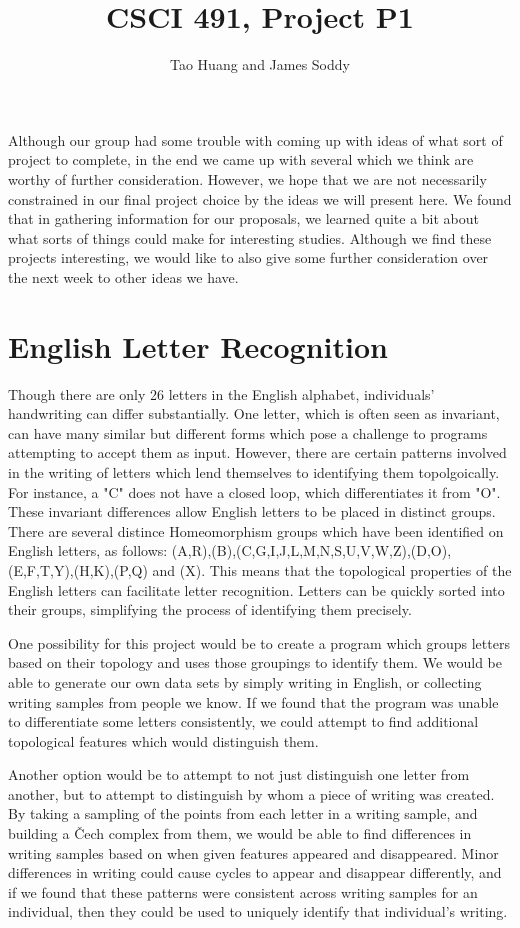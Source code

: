 \documentclass[11pt]{article}
\title{CSCI 491, Project P1}
\author{Tao Huang and James Soddy}
\begin{document}
\maketitle

Although our group had some trouble with coming up with ideas of what sort of project
to complete, in the end we came up with several which we think are worthy of
further consideration. However, we hope that we are not necessarily constrained in our 
final project choice by the ideas we will present here. We found that in gathering
information for our proposals, we learned quite a bit about what sorts of things
could make for interesting studies. Although we find these projects interesting, we
would like to also give some further consideration over the next week to other ideas we 
have.

\section*{English Letter Recognition}
Though there are only 26 letters in the English alphabet, individuals' handwriting 
can differ substantially. One letter, which is often seen as invariant, can have many
similar but different forms which pose a challenge to programs attempting to accept them 
as input. However, there are certain patterns involved in the writing of letters which
lend themselves to identifying them topolgoically. For instance, a 
"C" does not have a closed loop, which differentiates it from "O". These invariant differences
allow English letters to be placed in distinct groups. There are several distince
Homeomorphism groups which have been identified on English letters, as follows: (A,R),(B),(C,G,I,J,L,M,N,S,U,V,W,Z),(D,O),
(E,F,T,Y),(H,K),(P,Q) and (X)\cite{TopoIntro}. This means that the topological properties 
of the English letters can facilitate letter recognition. Letters can be quickly sorted into
their groups, simplifying the process of identifying them precisely. 

One possibility for this project would be to create a program which groups letters
based on their topology and uses those groupings to identify them. We would be able to 
generate our own data sets by simply writing in English, or collecting writing samples 
from people we know. If we found that the program was unable to differentiate some letters
consistently, we could attempt to find additional topological features which would
distinguish them.

Another option would be to attempt to not just distinguish one letter from another, but
to attempt to distinguish by whom a piece of writing was created. By taking a sampling of
the points from each letter in a writing sample, and building a Čech complex from them,
we would be able to find differences in writing samples based on when given features appeared
and disappeared. Minor differences in writing could cause cycles to appear and disappear
differently, and if we found that these patterns were consistent across writing samples
for an individual, then they could be used to uniquely identify that individual's writing.
\end{document}
